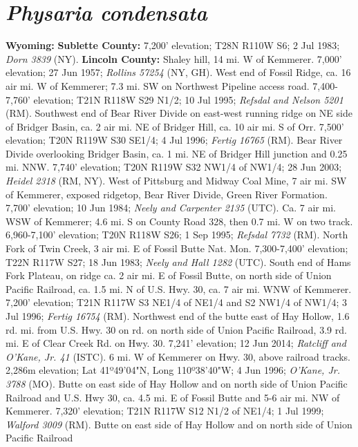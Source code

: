 \section*{\textit{Physaria condensata}}

  \textbf{Wyoming:}
  \textbf{Sublette County:}
7,200’ elevation; T28N R110W S6; 2 Jul 1983; \textit{Dorn 3839} (NY).
  \textbf{Lincoln County:}
Shaley hill, 14 mi. W of Kemmerer. 7,000' elevation; 27 Jun 1957;
\textit{Rollins 57254} (NY, GH).
West end of Fossil Ridge, ca. 16 air mi. W of Kemmerer; 7.3 mi. SW on Northwest
Pipeline access road. 7,400-7,760' elevation; T21N R118W S29 N1/2; 10 Jul 1995;
\textit{Refsdal and Nelson 5201} (RM).
Southwest end of Bear River Divide on east-west running ridge on NE side of
Bridger Basin, ca. 2 air mi. NE of Bridger Hill, ca. 10 air mi. S of Orr.
7,500' elevation; T20N R119W S30 SE1/4; 4 Jul 1996; \textit{Fertig 16765} (RM).
Bear River Divide overlooking Bridger Basin, ca. 1 mi. NE of Bridger Hill
junction and 0.25 mi. NNW. 7,740' elevation; T20N R119W S32 NW1/4 of NW1/4;
28 Jun 2003; \textit{Heidel 2318} (RM, NY).
West of Pittsburg and Midway Coal Mine, 7 air mi. SW of Kemmerer, exposed
ridgetop, Bear River Divide, Green River Formation. 7,700' elevation;
10 Jun 1984; \textit{Neely and Carpenter 2135} (UTC).
Ca. 7 air mi. WSW of Kemmerer; 4.6 mi. S on County Road 328, then 0.7 mi. W on
two track. 6,960-7,100' elevation; T20N R118W S26; 1 Sep 1995;
\textit{Refsdal 7732} (RM).
North Fork of Twin Creek, 3 air mi. E of Fossil Butte Nat. Mon.
7,300-7,400' elevation; T22N R117W S27; 18 Jun 1983;
\textit{Neely and Hall 1282} (UTC).
South end of Hams Fork Plateau, on ridge ca. 2 air mi. E of Fossil Butte,
on north side of Union Pacific Railroad, ca. 1.5 mi. N of U.S. Hwy. 30, ca. 7
air mi. WNW of Kemmerer. 7,200' elevation; T21N R117W S3 NE1/4 of NE1/4 and S2
NW1/4 of NW1/4; 3 Jul 1996; \textit{Fertig 16754} (RM).
Northwest end of the butte east of Hay Hollow, 1.6 rd. mi. from U.S. Hwy. 30 on
rd. on north side of Union Pacific Railroad, 3.9 rd. mi. E of Clear Creek Rd. on
Hwy. 30. 7,241' elevation; 12 Jun 2014;
\textit{Ratcliff and O'Kane, Jr. 41} (ISTC).
6 mi. W of Kemmerer on Hwy. 30, above railroad tracks. 2,286m elevation;
Lat 41º49'04"N, Long 110º38'40"W; 4 Jun 1996; \textit{O'Kane, Jr. 3788} (MO).
Butte on east side of Hay Hollow and on north side of Union Pacific Railroad
and U.S. Hwy 30, ca. 4.5 mi. E of Fossil Butte and 5-6 air mi. NW of Kemmerer.
7,320' elevation; T21N R117W S12 N1/2 of NE1/4; 1 Jul 1999;
\textit{Walford 3009} (RM).
Butte on east side of Hay Hollow and on north side of Union Pacific Railroad
